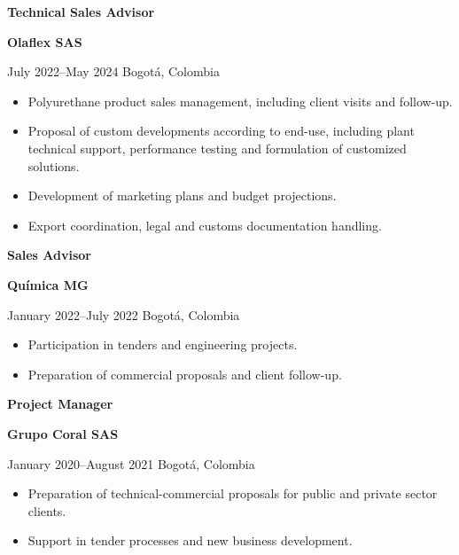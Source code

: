 \documentclass[10pt,a4paper]{altacv}
\renewcommand{\cvevent}[4]{%
  {\large\bfseries\color{emphasis}#1\par}
  \smallskip
  \textbf{\color{accent}#2}\par
  \smallskip
  {\small\faCalendar \hspace{0.5em}#3\hspace{2em}%
  \ifstrequal{#4}{}{}{\faMapMarker\hspace{0.5em}#4}\par}
  \medskip
}
\begin{document}
\cvevent{Technical Sales Advisor}{Olaflex SAS}{July 2022--May 2024}{Bogotá, Colombia}

\begin{itemize}
\item Polyurethane product sales management, including client visits and follow-up.
\item Proposal of custom developments according to end-use, including plant technical support, performance testing and formulation of customized solutions.
\item Development of marketing plans and budget projections.
\item Export coordination, legal and customs documentation handling.
\end{itemize}
\vspace{0.2 cm}
\cvevent{Sales Advisor}{Química MG}{January 2022--July 2022}{Bogotá, Colombia}

\begin{itemize}
\item Participation in tenders and engineering projects.
\item Preparation of commercial proposals and client follow-up.
\end{itemize}

\cvevent{Project Manager}{Grupo Coral SAS}{January 2020--August 2021}{Bogotá, Colombia}

\begin{itemize}
\item Preparation of technical-commercial proposals for public and private sector clients.
\item Support in tender processes and new business development.
\end{itemize}
\end{document}
